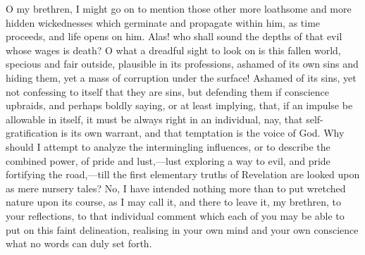 O my brethren, I might go on to mention those other more loathsome
and more hidden wickednesses which germinate and propagate within him,
as time proceeds, and life opens on him. Alas! who shall sound the
depths of that evil whose wages is death? O what a dreadful sight to
look on is this fallen world, specious and fair outside, plausible in
its professions, ashamed of its own sins and hiding them, yet a mass
of corruption under the surface! Ashamed of its sins, yet not
confessing to itself that they are sins, but defending them if
conscience upbraids, and perhaps boldly saying, or at least implying,
that, if an impulse be allowable in itself, it must be always right in
an individual, nay, that self-gratification is its own warrant, and
that temptation is the voice of God. Why should I attempt to analyze
the intermingling influences, or to describe the combined power, of
pride and lust,—lust exploring a way to evil, and pride fortifying
the road,—till the first elementary truths of Revelation are looked
upon as mere nursery tales? No, I have intended nothing more than to
put wretched nature upon its course, as I may call it, and there to
leave it, my brethren, to your reflections, to that individual comment
which each of you may be able to put on this faint delineation,
realising in your own mind and your own conscience what no words can
duly set forth.

